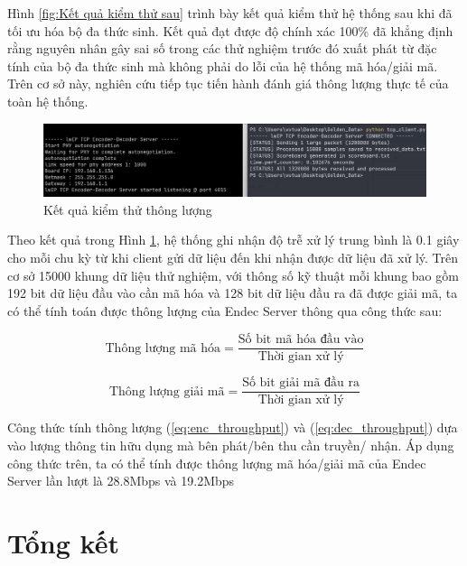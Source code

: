 \documentclass[../DoAn.tex]{subfiles}
\begin{document}
Hình \ref{fig:Kết quả kiểm thử sau} trình bày kết quả kiểm thử hệ thống sau khi đã tối ưu hóa bộ đa thức sinh. Kết quả đạt được độ chính xác 100\% đã khẳng định rằng nguyên nhân gây sai số trong các thử nghiệm trước đó xuất phát từ đặc tính của bộ đa thức sinh mà không phải do lỗi của hệ thống mã hóa/giải mã. Trên cơ sở này, nghiên cứu tiếp tục tiến hành đánh giá thông lượng thực tế của toàn hệ thống.

\begin{figure}[H]
    \centering
    \includegraphics[width=\textwidth, height=0.4\textheight, keepaspectratio]{Hinhve/Chuong 4/throughput.png}
    \caption{Kết quả kiểm thử thông lượng}
    \label{fig:Kết quả kiểm thử thông lượng}
\end{figure}

Theo kết quả trong Hình \ref{fig:Kết quả kiểm thử thông lượng}, hệ thống ghi nhận độ trễ xử lý trung bình là 0.1 giây cho mỗi chu kỳ từ khi client gửi dữ liệu đến khi nhận được dữ liệu đã xử lý. Trên cơ sở 15000 khung dữ liệu thử nghiệm, với thông số kỹ thuật mỗi khung bao gồm 192 bit dữ liệu đầu vào cần mã hóa và 128 bit dữ liệu đầu ra đã được giải mã, ta có thể tính toán được thông lượng của Endec Server thông qua công thức sau: 

\begin{equation}
\text{Thông lượng mã hóa} = \frac{\text{Số bit mã hóa đầu vào}}{\text{Thời gian xử lý}}
\label{eq:enc_throughput}
\end{equation}


\begin{equation}
\text{Thông lượng giải mã} = \frac{\text{Số bit giải mã đầu ra}}{\text{Thời gian xử lý}}
\label{eq:dec_throughput}
\end{equation}

Công thức tính thông lượng (\ref{eq:enc_throughput}) và (\ref{eq:dec_throughput}) dựa vào lượng thông tin hữu dụng mà bên phát/bên thu cần truyền/ nhận. Áp dụng công thức trên, ta có thể tính được thông lượng mã hóa/giải mã của Endec Server lần lượt là 28.8Mbps và 19.2Mbps

\section{Tổng kết}
\end{document}
